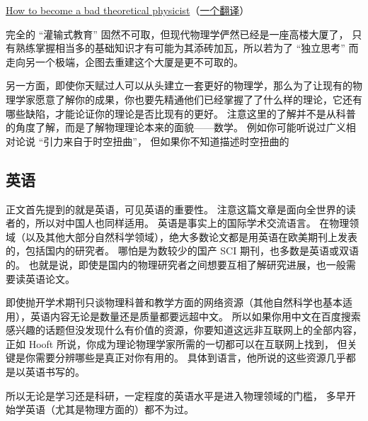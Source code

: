 \href{https://webspace.science.uu.nl/~hooft101/theoristbad.html#:~:text=On\%20your\%20way\%20towards\%20becoming,have\%20your\%20work\%20published\%20anyway.}{How to become a bad theoretical physicist}（\href{https://zhuanlan.zhihu.com/p/38680467}{一个翻译}）

完全的 “灌输式教育” 固然不可取，但现代物理学俨然已经是一座高楼大厦了， 只有熟练掌握相当多的基础知识才有可能为其添砖加瓦，所以若为了 “独立思考” 而走向另一个极端，企图去重建这个大厦是更不可取的。

另一方面，即使你天赋过人可以从头建立一套更好的物理学，那么为了让现有的物理学家愿意了解你的成果，你也要先精通他们已经掌握了了什么样的理论，它还有哪些缺陷，才能论证你的理论是否比现有的更好。 注意这里的了解并不是从科普的角度了解，而是了解物理理论本来的面貌——数学。 例如你可能听说过广义相对论说 “引力来自于时空扭曲”， 但如果你不知道描述时空扭曲的

\subsection{英语}
正文首先提到的就是英语，可见英语的重要性。 注意这篇文章是面向全世界的读者的，所以对中国人也同样适用。 英语是事实上的国际学术交流语言。 在物理领域（以及其他大部分自然科学领域），绝大多数论文都是用英语在欧美期刊上发表的，包括国内的研究者。 哪怕是为数较少的国产 SCI 期刊，也多数是英语或双语的。 也就是说，即使是国内的物理研究者之间想要互相了解研究进展，也一般需要读英语论文。

即使抛开学术期刊只谈物理科普和教学方面的网络资源（其他自然科学也基本适用），英语内容无论是数量还是质量都要远超中文。 所以如果你用中文在百度搜索感兴趣的话题但没发现什么有价值的资源，你要知道这远非互联网上的全部内容， 正如 Hooft 所说，你成为理论物理学家所需的一切都可以在互联网上找到， 但关键是你需要分辨哪些是真正对你有用的。 具体到语言，他所说的这些资源几乎都是以英语书写的。

所以无论是学习还是科研，一定程度的英语水平是进入物理领域的门槛， 多早开始学英语（尤其是物理方面的）都不为过。
